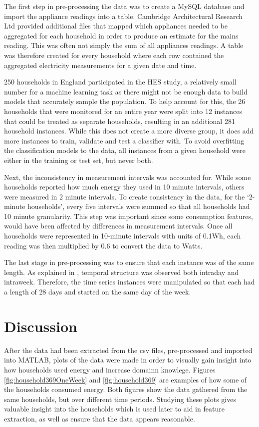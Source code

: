 The first step in pre-processing the data was to create a MySQL database and import the appliance readings into a table. Cambridge Architectural Research Ltd \cite{CARG_1} provided additional files that mapped which appliances needed to be aggregated for each household in order to produce an estimate for the mains reading. This was often not simply the sum of all appliances readings. A table was therefore created for every household where each row contained the aggregated electricity measurements for a given date and time. 

250 households in England participated in the HES study, a relatively small number for a machine learning task as there might not be enough data to build models that accurately sample the population. To help account for this, the 26 households that were monitored for an entire year were split into 12 instances that could be treated as separate households, resulting in an additional 281 household instances. While this does not create a more diverse group, it does add more instances to train, validate and test a classifier with. To avoid overfitting the classification models to the data, all instances from a given household were either in the training or test set, but never both.

Next, the inconsistency in measurement intervals was accounted for. While some households reported how much energy they used in 10 minute intervals, others were measured in 2 minute intervals. To create consistency in the data, for the `2-minute households', every five intervals were summed so that all households had 10 minute granularity. This step was important since some consumption features, would have been affected by differences in measurement intervals. Once all households were represented in 10-minute intervals with units of 0.1Wh, each reading was then multiplied by 0.6 to convert the data to Watts.

The last stage in pre-processing was to ensure that each instance was of the same length. As explained in \fourierSection, temporal structure was observed both intraday and intraweek. Therefore, the time series instances were manipulated so that each had a length of 28 days and started on the same day of the week.

\section{Discussion}

After the data had been extracted from the csv files, pre-processed and imported into MATLAB, plots of the data were made in order to visually gain insight into how households used energy and increase domainn knowlege. Figures \ref{fig:household369OneWeek} and \ref{fig:household369} are examples of how some of the households consumed energy. Both figures show the data gathered from the same households, but over different time periods. Studying these plots gives valuable insight into the households which is used later to aid in feature extraction, as well as ensure that the data appears reasonable. 

